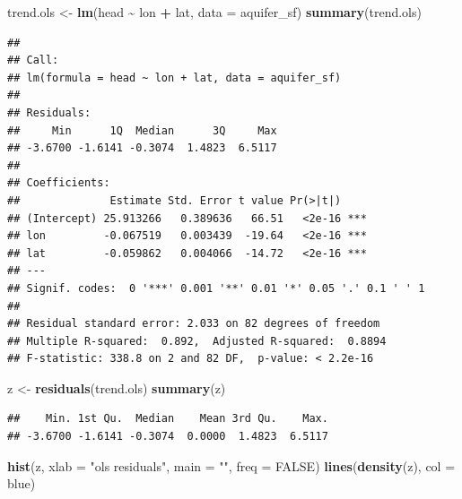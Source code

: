 \documentclass[
]{book}
\newenvironment{Shaded}{\begin{snugshade}}{\end{snugshade}}
\newcommand{\AttributeTok}[1]{\textcolor[rgb]{0.13,0.29,0.53}{#1}}
\newcommand{\ConstantTok}[1]{\textcolor[rgb]{0.56,0.35,0.01}{#1}}
\newcommand{\FunctionTok}[1]{\textcolor[rgb]{0.13,0.29,0.53}{\textbf{#1}}}
\newcommand{\NormalTok}[1]{#1}
\newcommand{\OtherTok}[1]{\textcolor[rgb]{0.56,0.35,0.01}{#1}}
\newcommand{\SpecialCharTok}[1]{\textcolor[rgb]{0.81,0.36,0.00}{\textbf{#1}}}
\newcommand{\StringTok}[1]{\textcolor[rgb]{0.31,0.60,0.02}{#1}}
\theoremstyle{break}
\theoremstyle{definition}
\theoremstyle{definition}
\theoremstyle{definition}
\theoremstyle{definition}
\theoremstyle{remark}
\begin{document}
\begin{Shaded}
\begin{Highlighting}[]
\NormalTok{trend.ols }\OtherTok{\textless{}{-}} \FunctionTok{lm}\NormalTok{(head }\SpecialCharTok{\textasciitilde{}}\NormalTok{ lon }\SpecialCharTok{+}\NormalTok{ lat, }\AttributeTok{data =}\NormalTok{ aquifer\_sf)}
\FunctionTok{summary}\NormalTok{(trend.ols)}
\end{Highlighting}
\end{Shaded}

\begin{verbatim}
## 
## Call:
## lm(formula = head ~ lon + lat, data = aquifer_sf)
## 
## Residuals:
##     Min      1Q  Median      3Q     Max 
## -3.6700 -1.6141 -0.3074  1.4823  6.5117 
## 
## Coefficients:
##              Estimate Std. Error t value Pr(>|t|)    
## (Intercept) 25.913266   0.389636   66.51   <2e-16 ***
## lon         -0.067519   0.003439  -19.64   <2e-16 ***
## lat         -0.059862   0.004066  -14.72   <2e-16 ***
## ---
## Signif. codes:  0 '***' 0.001 '**' 0.01 '*' 0.05 '.' 0.1 ' ' 1
## 
## Residual standard error: 2.033 on 82 degrees of freedom
## Multiple R-squared:  0.892,  Adjusted R-squared:  0.8894 
## F-statistic: 338.8 on 2 and 82 DF,  p-value: < 2.2e-16
\end{verbatim}

\begin{Shaded}
\begin{Highlighting}[]
\NormalTok{z }\OtherTok{\textless{}{-}} \FunctionTok{residuals}\NormalTok{(trend.ols)}
\FunctionTok{summary}\NormalTok{(z)}
\end{Highlighting}
\end{Shaded}

\begin{verbatim}
##    Min. 1st Qu.  Median    Mean 3rd Qu.    Max. 
## -3.6700 -1.6141 -0.3074  0.0000  1.4823  6.5117
\end{verbatim}

\begin{Shaded}
\begin{Highlighting}[]
\FunctionTok{hist}\NormalTok{(z, }\AttributeTok{xlab =} \StringTok{"ols residuals"}\NormalTok{, }\AttributeTok{main =} \StringTok{""}\NormalTok{, }\AttributeTok{freq =} \ConstantTok{FALSE}\NormalTok{)}
\FunctionTok{lines}\NormalTok{(}\FunctionTok{density}\NormalTok{(z), }\AttributeTok{col =} \StringTok{\textquotesingle{}blue\textquotesingle{}}\NormalTok{)}
\end{Highlighting}
\end{Shaded}
\end{document}
